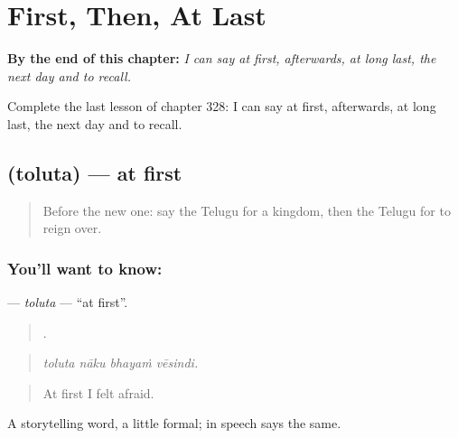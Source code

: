
\chapter{First, Then, At Last}
\label{ch:te-first-then-at-last}

\begin{chapteropening}
\textbf{By the end of this chapter:} \emph{I can say at first, afterwards, at long last, the next day and to recall.}

Complete the last lesson of chapter 328: I can say at first, afterwards, at long last, the next day and to recall.
\end{chapteropening}

\section[\texorpdfstring{\te{తొలుత} (toluta)}{తొలుత (toluta)}]{ (toluta) — at first}

\label{lesson:TE-C328-toluta}



\begin{quote}
Before the new one: say the Telugu for a kingdom, then the Telugu for to reign over.
\end{quote}

\subsection*{You'll want to know: }
\textbf{} — \emph{toluta} — \textquotedblleft{}at first\textquotedblright{}.

\begin{quote}
   .
\end{quote}

\begin{quote}
\emph{toluta nāku bhayaṁ vēsindi.}
\end{quote}

\begin{quote}
At first I felt afraid.
\end{quote}

A storytelling word, a little formal; in speech  says the same.

